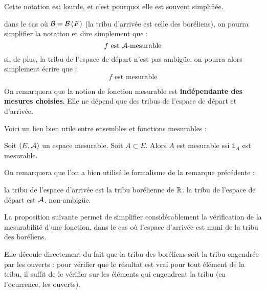 \documentclass[../integ-proba.tex]{subfiles}
\begin{document}
  \begin{rem}
    \label{rem:simplification_notation_fonctions_mesurables}
    Cette notation est lourde, et c'est pourquoi elle est souvent simplifiée.
    \begin{itemize}
    \itemb dans le cas où $\mathcal{B}=\mathcal{B}\left(F\right)$ (la tribu d'arrivée est celle des boréliens), on pourra simplifier la notation et dire simplement que :
    \begin{displaymath}
      f \text{ est } \mathcal{A}\text{-mesurable}
    \end{displaymath}
    \itemb si, de plus, la tribu de l'espace de départ n'est pas ambigüe, on pourra alors simplement écrire que :
    \begin{displaymath}
      f \text{ est mesurable}
    \end{displaymath}
    \end{itemize}
  \end{rem}

  \begin{rem}
    On remarquera que la notion de fonction mesurable est \textbf{indépendante des mesures choisies}.
    Elle ne dépend que des tribus de l'espace de départ et d'arrivée.
  \end{rem}

  Voici un lien bien utile entre ensembles et fonctions mesurables :

  \begin{prop}
    \label{prop:lienensfctmes}
    Soit $\left(E, \mathcal{A}\right)$ un espace mesurable.
    Soit $A\subset E$.
    Alors $A$ est mesurable ssi $\mathds{1}_A$ est mesurable.
  \end{prop}

  \begin{rem}
    On remarquera que l'on a bien utilisé le formalisme de la remarque précédente :
    \begin{itemize}
      \itemb la tribu de l'espace d'arrivée est la tribu borélienne de $\mathbb{R}$.
      \itemb la tribu de l'espace de départ est $\mathcal{A}$, non-ambigüe.
    \end{itemize}
  \end{rem}

  La proposition suivante permet de simplifier considérablement la vérification de la mesurabilité d'une fonction, dans le cas où l'espace d'arrivée est muni de la tribu des boréliens.

  Elle découle directement du fait que la tribu des boréliens soit la tribu engendrée par les ouverts :
  pour vérifier que le résultat est vrai pour tout élément de la tribu, il suffit de le vérifier sur les éléments qui engendrent la tribu (en l'ocurrence, les ouverts).
\end{document}
